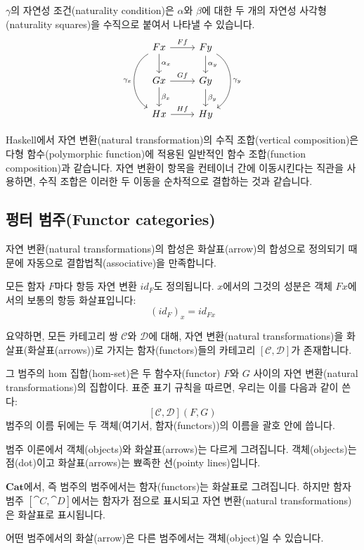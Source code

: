 \documentclass[DaoFP]{subfiles}
\begin{document}
$\gamma$의 자연성 조건(naturality condition)은 $\alpha$와 $\beta$에 대한 두 개의 자연성 사각형(naturality squares)을 수직으로 붙여서 나타낼 수 있습니다.
\[
 \begin{tikzcd}
 F x
 \arrow[d, "\alpha_x"]
 \arrow[r, "F f"]
 \arrow[dd, bend right = 60, "\gamma_x"']
 &
F y
  \arrow[d, "\alpha_y"]
 \arrow[dd, bend left = 60, "\gamma_y"]
 \\
G x
 \arrow[r, "G f"]
 \arrow[d, "\beta_x"]
& G y
\arrow[d, "\beta_y"]
\\
H x
\arrow[r, "H f"]
& H y
 \end{tikzcd}
\]

Haskell에서 자연 변환(natural transformation)의 수직 조합(vertical composition)은 다형 함수(polymorphic function)에 적용된 일반적인 함수 조합(function composition)과 같습니다. 자연 변환이 항목을 컨테이너 간에 이동시킨다는 직관을 사용하면, 수직 조합은 이러한 두 이동을 순차적으로 결합하는 것과 같습니다.

\subsection{펑터 범주(Functor categories)}

자연 변환(natural transformations)의 합성은 화살표(arrow)의 합성으로 정의되기 때문에 자동으로 결합법칙(associative)을 만족합니다.

모든 함자 $F$마다 항등 자연 변환 $id_F$도 정의됩니다. $x$에서의 그것의 성분은 객체 $F x$에서의 보통의 항등 화살표입니다:
\[ (id_F)_x = id_{F x} \]

요약하면, 모든 카테고리 쌍 $\mathcal{C}$와 $\mathcal{D}$에 대해, 자연 변환(natural transformations)을 화살표(화살표(arrows))로 가지는 함자(functors)들의 카테고리 $[\mathcal{C}, \mathcal{D}]$가 존재합니다.

그 범주의 hom 집합(hom-set)은 두 함수자(functor) $F$와 $G$ 사이의 자연 변환(natural transformations)의 집합이다. 표준 표기 규칙을 따르면, 우리는 이를 다음과 같이 쓴다:
\[ [\mathcal{C}, \mathcal{D}](F, G) \]
범주의 이름 뒤에는 두 객체(여기서, 함자(functors))의 이름을 괄호 안에 씁니다.

범주 이론에서 객체(objects)와 화살표(arrows)는 다르게 그려집니다. 객체(objects)는 점(dot)이고 화살표(arrows)는 뾰족한 선(pointy lines)입니다.

$\mathbf{Cat}$에서, 즉 범주의 범주에서는 함자(functors)는 화살표로 그려집니다. 하지만 함자 범주 $[\cat C, \cat D]$에서는 함자가 점으로 표시되고 자연 변환(natural transformations)은 화살표로 표시됩니다.

어떤 범주에서의 화살(arrow)은 다른 범주에서는 객체(object)일 수 있습니다.
\end{document}
